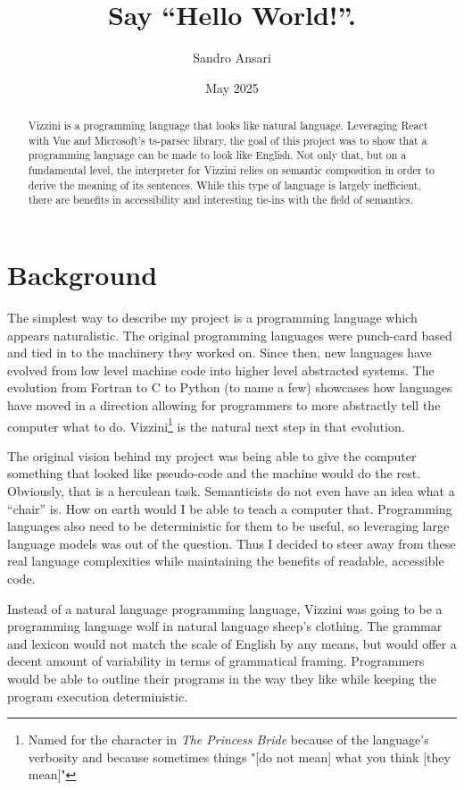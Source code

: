 \documentclass[titlepage]{article}
\title{Say ``Hello World!''.}
\author{Sandro Ansari}
\date{May 2025}
\newcommand{\langName}{Vizzini}
\begin{document}
\maketitle

\begin{abstract}
	\langName{} is a programming language that looks like natural language. Leveraging React with Vue and Microsoft's ts-parsec library, the goal of this project was to show that a programming language can be made to look like English. Not only that, but on a fundamental level, the interpreter for \langName{} relies on semantic composition in order to derive the meaning of its sentences. While this type of language is largely inefficient, there are benefits in accessibility and interesting tie-ins with the field of semantics.
\end{abstract}

\section*{Background}
The simplest way to describe my project is a programming language which appears naturalistic. The original programming languages were punch-card based and tied in to the machinery they worked on. Since then, new languages have evolved from low level machine code into higher level abstracted systems. The evolution from Fortran to C to Python (to name a few) showcases how languages have moved in a direction allowing for programmers to more abstractly tell the computer what to do. \langName{}\footnote{Named for the character in \textit{The Princess Bride} because of the language's verbosity and because sometimes things "[do not mean] what you think [they mean]"\cite{Goldman_1987}} is the natural next step in that evolution.

The original vision behind my project was being able to give the computer something that looked like pseudo-code and the machine would do the rest. Obviously, that is a herculean task. Semanticists do not even have an idea what a “chair” is. How on earth would I be able to teach a computer that. Programming languages also need to be deterministic for them to be useful, so leveraging large language models was out of the question. Thus I decided to steer away from these real language complexities while maintaining the benefits of readable, accessible code.

Instead of a natural language programming language, \langName{} was going to be a programming language wolf in natural language sheep's clothing. The grammar and lexicon would not match the scale of English by any means, but would offer a decent amount of variability in terms of grammatical framing. Programmers would be able to outline their programs in the way they like while keeping the program execution deterministic.
\end{document}

